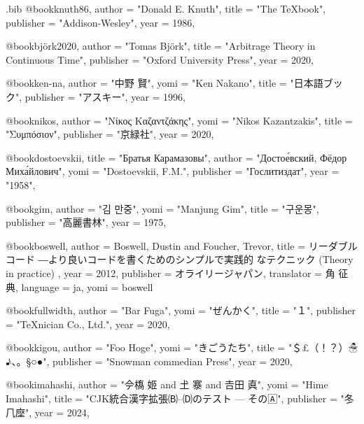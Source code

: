 
\begin{filecontents}[overwrite]{\jobname.bib}
@book{knuth86,
  author    = "Donald E. Knuth",
  title     = "The \TeX book",
  publisher = "Addison-Wesley",
  year      = 1986,
}

@book{björk2020,
  author    = "Tomas Björk",
  title     = "Arbitrage Theory in Continuous Time",
  publisher = "Oxford University Press",
  year      = 2020,
}

@book{ken-na,
  author    = "中野 賢",
  yomi      = "Ken Nakano",
  title     = "日本語{\LaTeXe}ブック",
  publisher = "アスキー",
  year      = 1996,
}

@book{nikos,
  author    = "Νίκος Καζαντζάκης",
  yomi      = "Nikos Kazantzakis",
  title     = "Συμπόσιον",
  publisher = "京緑社",
  year      = 2020,
}

@book{dostoevskii,
  title     = "Братья Карамазовы",
  author    = "Достое́вский, Фёдор Миха́йлович",
  yomi      = "Dostoevskii, F.M.",
  publisher = "Гослитиздат",
  year      = "1958",
}

@book{gim,
  author    = "김 만중",
  yomi      = "Manjung Gim",
  title     = "구운몽",
  publisher = "高麗書林",
  year      = 1975,
}

@book{boswell,
  author     = {Boswell, Dustin and Foucher, Trevor},
  title      = {リーダブルコード ―より良いコードを書くためのシンプルで実践的
                なテクニック (Theory in practice) },
  year       = 2012,
  publisher  = {オライリージャパン},
  translator = {角 征典},
  language   = {ja},
  yomi       = {boswell}
}

@book{fullwidth,
  author    = "Bar Fuga",
  yomi      = "ぜんかく",
  title     = "１",
  publisher = "TeXnician Co., Ltd.",
  year      = 2020,
}

@book{kigou,
  author    = "Foo Hoge",
  yomi      = "きごうたち",
  title     = "＄£（！？）☃♪、。§○●",
  publisher = "Snowman commedian Press",
  year      = 2020,
}

@book{imahashi,
  author    = "𫝆𫞎 姬 and 𡈽 𪧦 and 𠮷田 真",
  yomi      = "Hime Imahashi",
  title     = "CJK統合漢字拡張🄑--🄓のテスト --- その🄰",
  publisher = "冬𠘨𫝷",
  year      = 2024,
}
\end{filecontents}

\documentclass{ltjsarticle}
\usepackage{luatexja-fontspec}
\usepackage[sourcehan]{luatexja-preset}
\setmainfont{XITS}%

test
\nocite{*}



